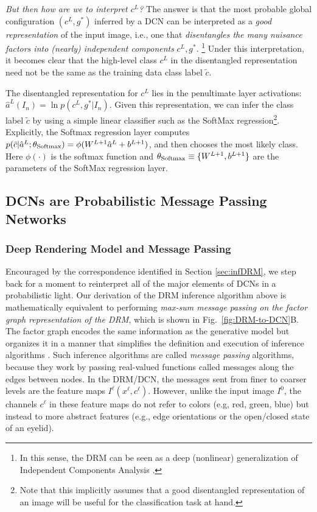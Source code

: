 \documentclass[12pt]{article}
\begin{document}
\emph{But then how are we to interpret $c^L$?} The answer is that the most probable global configuration $(c^{L},g^{*})$ inferred by a DCN can be interpreted as a \emph{good representation} of the input image, i.e., one that \emph{disentangles the many nuisance factors into (nearly) independent components} $c^{L},g^{*}$. \footnote{In this sense, the DRM can be seen as a deep (nonlinear) generalization of Independent Components Analysis \cite{hyvarinen2004independent}.} Under this interpretation, it becomes clear that the high-level class $c^L$ in the disentangled representation need not be the same as the training data class label $\tilde{c}$.

The disentangled representation for $c^L$ lies in the penultimate layer activations: $\hat{a}^{L}(I_{n}) = \ln p(c^{L},g^{*}|I_{n})$. Given this representation, we can infer the class label $\tilde{c}$ by using a simple linear classifier such as the SoftMax regression\footnote{Note that this implicitly assumes that a good disentangled representation of an image will be useful for the classification task at hand.}. Explicitly, the Softmax regression layer computes $p(\tilde{c} | \hat{a}^{L}; \theta_{\rm Softmax}) = \phi(W^{L+1} \hat{a}^L + b^{L+1})$, and then chooses the most likely class. Here $\phi(\cdot)$ is the softmax function and $\theta_{\rm Softmax}\equiv\{W^{L+1}, b^{L+1} \}$ are the parameters of the SoftMax regression layer.

\subsection{DCNs are Probabilistic Message Passing Networks}

\subsubsection{Deep Rendering Model and Message Passing}

Encouraged by the correspondence identified in Section \ref{sec:infDRM}, we step back for a moment to reinterpret all of the major elements of DCNs in a probabilistic light. Our derivation of the DRM inference algorithm above is mathematically equivalent to performing \emph{max-sum message passing on the factor graph representation of the DRM}, which is shown in Fig.~\ref{fig:DRM-to-DCN}B. The factor graph encodes the same information as the generative model but organizes it in a manner that simplifies the definition and execution of inference algorithms \cite{kschischang2001factor}. Such inference algorithms are called {\em message passing} algorithms, because they work by passing real-valued functions called messages along the edges between nodes. 
In the DRM/DCN, the messages sent from finer to coarser levels are the feature maps $I^\ell(x^\ell, c^\ell)$. However, unlike the input image $I^{0}$, the channels $c^{\ell}$ in these feature maps do not refer to colors (e.g, red, green, blue) but instead to more abstract features (e.g., edge orientations or the open/closed state of an eyelid).
\end{document}
